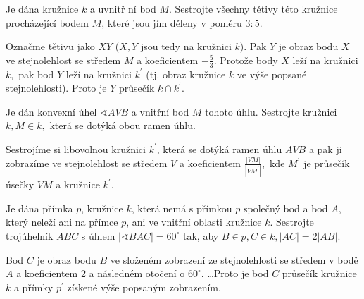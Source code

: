 \begin{priklad}
Je dána kružnice $k$ a uvnitř ní bod $M$. Sestrojte všechny tětivy této kružnice
procházející bodem $M$, které jsou jím děleny v poměru $3:5.$
\end{priklad}

\begin{reseni}
Označme tětivu jako $XY$ ($X,Y$ jsou tedy na kružnici $k$). Pak $Y$ je obraz
bodu $X$ ve stejnolehlost se středem $M$ a koeficientem $-\frac{5}{3}$. Protože
body $X$ leží na kružnici $k,$ pak bod $Y$ leží na kružnici $k^\prime$ (tj. obraz
kružnice $k$ ve výše popsané stejnolehlosti). Proto je $Y$ průsečík $k\cap k^\prime$.
\end{reseni}

\begin{priklad}
Je dán konvexní úhel $\sphericalangle AVB$ a vnitřní bod $M$ tohoto úhlu. Sestrojte kružnici $k,M\in k,$
která se dotýká obou ramen úhlu.
\end{priklad}

\begin{reseni}
Sestrojíme si libovolnou kružnici $k^\prime$, která se dotýká ramen úhlu $AVB$ a pak
ji zobrazíme ve stejnolehlost se středem $V$ a koeficientem $\frac{|VM|}{|VM^\prime|},$
kde $M^\prime$ je průsečík úsečky $VM$ a kružnice $k^\prime$.
\end{reseni}

\begin{priklad}
Je dána přímka $p$, kružnice $k$, která nemá s přímkou $p$ společný bod a bod $A$, který
neleží ani na přímce $p$, ani ve vnitřní oblasti kružnice $k$. Sestrojte trojúhelník
$ABC$ s úhlem $|\sphericalangle BAC|=60^\circ$ tak, aby $B\in p, C \in k, |AC|=2|AB|.$
\end{priklad}

\begin{reseni}
Bod $C$ je obraz bodu $B$ ve složeném zobrazení ze stejnolehlosti se středem v bodě
$A$ a koeficientem 2 a následném otočení o $60^\circ.$ \dots Proto je bod $C$ průsečík
kružnice $k$ a přímky $p^\prime$ získené výše popsaným zobrazením.
\end{reseni}
